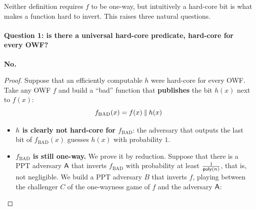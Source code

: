 Neither definition requires $f$ to be one-way, but intuitively a hard-core bit is what makes a function hard to invert. This raises three natural questions.

\paragraph{Question 1: is there a universal hard-core predicate, hard-core for every OWF?} \textbf{No.}

\begin{proof}
  Suppose that an efficiently computable $h$ were hard-core for every OWF. Take any OWF $f$ and build a ``bad'' function that \textbf{publishes} the bit $h(x)$ next to $f(x)$:
  \[
    f_{\mathrm{BAD}}(x) = f(x) \mathbin{\Vert} h(x)
  \]
  \begin{itemize}
    \item \textbf{$h$ is clearly not hard-core for $f_{\mathrm{BAD}}$}: the adversary that outputs the last bit of $f_{\mathrm{BAD}}(x)$ guesses $h(x)$ with probability $1$.
    \item \textbf{$f_{\mathrm{BAD}}$ is still one-way.} We prove it by reduction. Suppose that there is a PPT adversary $\mathsf{A}$ that inverts $f_{\mathrm{BAD}}$ with probability at least $\frac{1}{\mathsf{poly}(n)}$, that is, not negligible. We build a PPT adversary $B$ that inverts $f$, playing between the challenger $C$ of the one-wayness game of $f$ and the adversary $\mathsf{A}$:
  \end{itemize}

  \begin{center}
  \end{center}


\end{proof}
